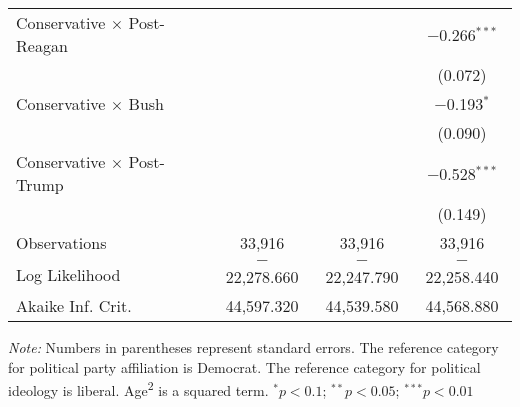 \begin{ThreePartTable}
\begin{tabularx}{\textwidth}{Xccc}
  Conservative $\times$ Post-Reagan &  &  & $-$0.266$^{***}$ \\ 
  &  &  & (0.072) \\ 
  Conservative $\times$ Bush &  &  & $-$0.193$^{*}$ \\ 
  &  &  & (0.090) \\ 
  Conservative $\times$ Post-Trump &  &  & $-$0.528$^{***}$ \\ 
  &  &  & (0.149) \\ 
 \midrule  
Observations & 33,916 & 33,916 & 33,916 \\ 
Log Likelihood & $-$22,278.660 & $-$22,247.790 & $-$22,258.440 \\ 
Akaike Inf. Crit. & 44,597.320 & 44,539.580 & 44,568.880 \\ 
\end{tabularx} 
{\it Note:} Numbers in parentheses represent standard errors. The reference category for political party affiliation is Democrat. The reference category for political ideology is liberal. Age\textsuperscript{2} is a squared term. \newline $^{*}p<0.1$; $^{**}p<0.05$; $^{***}p<0.01$
\bigskip 
\end{ThreePartTable} 

